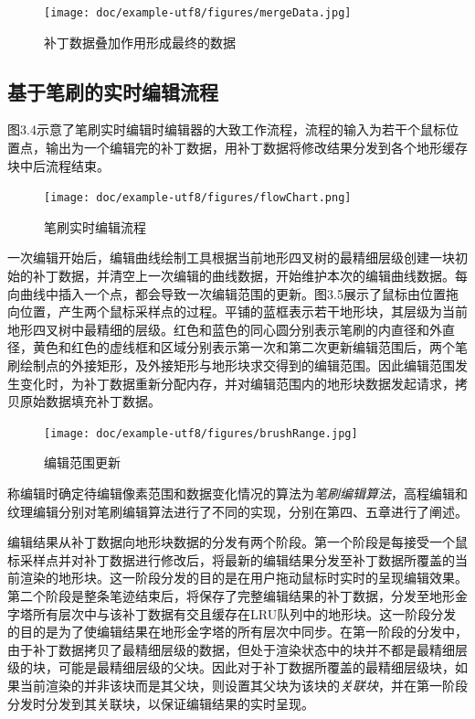 \begin{figure}[htbp]
\centering
\texttt{[image: doc/example-utf8/figures/mergeData.jpg]}
\caption{补丁数据叠加作用形成最终的数据}
\end{figure}

\subsection{基于笔刷的实时编辑流程}
图3.4示意了笔刷实时编辑时编辑器的大致工作流程，流程的输入为若干个鼠标位置点，输出为一个编辑完的补丁数据，用补丁数据将修改结果分发到各个地形缓存块中后流程结束。\par
\begin{figure}[htbp]
\centering
\texttt{[image: doc/example-utf8/figures/flowChart.png]}
\caption{笔刷实时编辑流程}
\end{figure}
一次编辑开始后，编辑曲线绘制工具根据当前地形四叉树的最精细层级创建一块初始的补丁数据，并清空上一次编辑的曲线数据，开始维护本次的编辑曲线数据。每向曲线中插入一个点，都会导致一次编辑范围的更新。图3.5展示了鼠标由位置拖向位置，产生两个鼠标采样点的过程。平铺的蓝框表示若干地形块，其层级为当前地形四叉树中最精细的层级。红色和蓝色的同心圆分别表示笔刷的内直径和外直径，黄色和红色的虚线框和区域分别表示第一次和第二次更新编辑范围后，两个笔刷绘制点的外接矩形，及外接矩形与地形块求交得到的编辑范围。因此编辑范围发生变化时，为补丁数据重新分配内存，并对编辑范围内的地形块数据发起请求，拷贝原始数据填充补丁数据。\par
\begin{figure}[htbp]
\centering
\texttt{[image: doc/example-utf8/figures/brushRange.jpg]}
\caption{编辑范围更新}
\end{figure}
称编辑时确定待编辑像素范围和数据变化情况的算法为\textit{笔刷编辑算法}，高程编辑和纹理编辑分别对笔刷编辑算法进行了不同的实现，分别在第四、五章进行了阐述。\par
编辑结果从补丁数据向地形块数据的分发有两个阶段。第一个阶段是每接受一个鼠标采样点并对补丁数据进行修改后，将最新的编辑结果分发至补丁数据所覆盖的当前渲染的地形块。这一阶段分发的目的是在用户拖动鼠标时实时的呈现编辑效果。第二个阶段是整条笔迹结束后，将保存了完整编辑结果的补丁数据，分发至地形金字塔所有层次中与该补丁数据有交且缓存在LRU队列中的地形块。这一阶段分发的目的是为了使编辑结果在地形金字塔的所有层次中同步。在第一阶段的分发中，由于补丁数据拷贝了最精细层级的数据，但处于渲染状态中的块并不都是最精细层级的块，可能是最精细层级的父块。因此对于补丁数据所覆盖的最精细层级块，如果当前渲染的并非该块而是其父块，则设置其父块为该块的\textit{关联块}，并在第一阶段分发时分发到其关联块，以保证编辑结果的实时呈现。\par

